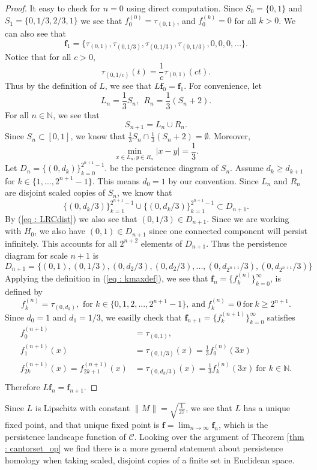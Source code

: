 \documentclass [52pt] {article}
\newcommand{\N}{\mathbb{N}}
\begin{document}
\begin{proof}
It easy to check for $n = 0$ using direct computation.  Since $S_0 = \{0,1\}$ and $S_1 = \{0,1/3,2/3,1\}$ we see that $f_0^{(0)} = \tau_{(0,1)}$, and $f_0^{(k)} = 0$ for all $k> 0$.  We can also see that 
\[\mathbf{f}_1 = \{\tau_{(0,1)}, \tau_{(0,1/3)}, \tau_{(0,1/3)}, \tau_{(0,1/3)},0,0,0,...\}.\]
Notice that for all $c>0$, 
\[\tau_{(0,1/c)}(t) = \frac{1}{c}\tau_{(0,1)}(ct).\]
Thus by the definition of $L$, we see that $L\mathbf{f}_0 = \mathbf{f}_1$.   For convenience, let 
\[L_n = \frac{1}{3}S_n,\:\:R_n = \frac{1}{3}(S_n +2).\]
For all $n\in\N$, we see that
\[S_{n+1} = L_n\cup R_n.\]
Since $S_n\subset[0,1]$, we know that $\frac{1}{3}S_n\cap \frac{1}{3}(S_n+2) = \emptyset$.  Moreover,
\begin{equation}\label{eq : LRCdist}
\min_{x\in L_n,y\in R_n} |x-y| = \frac{1}{3}.
\end{equation}
Let $D_n = \{(0,d_k)\}_{k=0}^{2^{n+1}-1}$. be the persistence diagram of $S_n$.  Assume $d_k\ge d_{k+1}$ for $k\in\{1,...,2^{n+1}-1\}$.  This means $d_0 = 1$ by our convention.  Since $L_n$ and $R_n$ are disjoint scaled copies of $S_n$, we know that 
\[\{(0,d_k/3)\}_{k =1}^{2^{n+1}-1}\cup\{(0,d_k/3)\}_{k =1}^{2^{n+1}-1}\subset D_{n+1}.\]
By (\ref{eq : LRCdist}) we also see that $(0,1/3)\in D_{n+1}$.  Since we are working with $H_0$, we also have $(0,1)\in D_{n+1}$ since one connected component will persist infinitely.  This accounts for all $2^{n+2}$ elements of $D_{n+1}$.  Thus the persistence diagram for scale $n+1$ is 
\[D_{n+1} = \{(0,1), (0,1/3), (0,d_2/3), (0,d_2/3), ...,(0,d_{2^{n+1}}/3), (0,d_{2^{n+1}}/3)\}\]
Applying the definition in (\ref{eq : kmaxdef}), we see that $\mathbf{f}_n = \{f_k^{(n)}\}_{k=0}^\infty$, is defined by
\[f_k^{(n)} = \tau_{(0,d_k)}, \text{ for } k\in\{0,1,2,...,2^{n+1}-1\}, \:\text{and}\:f_k^{(n)}=0\: \text{for}\: k\ge 2^{n+1}.\]
Since $d_0 = 1$ and $d_1 = 1/3$, we easilly check that $\mathbf{f}_{n+1} = \{f_k^{(n+1)}\}_{k=0}^\infty$ satisfies 
\[\begin{split}
f_0^{(n+1)} &= \tau_{(0,1)},\\
f_1^{(n+1)}(x) &= \tau_{(0,1/3)}(x) = \frac{1}{3}f_0^{(n)}(3x)\\
f_{2k}^{(n+1)}(x) = f_{2k+1}^{(n+1)}(x) &= \tau_{(0,d_k/3)}(x) = \frac{1}{3}f_k^{(n)}(3x)\:\text{for } k\in\N .\\ 
\end{split}\]
Therefore $L\mathbf{f}_n = \mathbf{f}_{n+1}$.

\end{proof}
Since $L$ is Lipschitz with constant $\|M\| = \sqrt{\frac{1}{27}}$, we see that $L$ has a unique fixed point, and that unique fixed point is $\mathbf{f} = \lim_{n\to\infty}\mathbf{f}_n$, which is the persistence landscape function of $\mathcal{C}$.  Looking over the argument of Theorem \ref{thm :  cantorset_op} we find there is a more general statement about persistence homology when taking scaled, disjoint copies of a finite set in Euclidean space.
\end{document}
